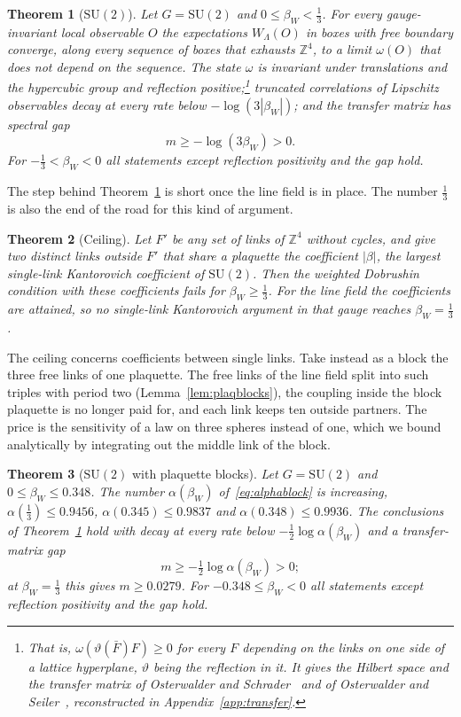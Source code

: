 \documentclass[aps,prd,twocolumn,superscriptaddress,nofootinbib,longbibliography,floatfix,amsmath,amssymb,10pt]{revtex4-2}
\newtheorem{theorem}{Theorem}
\theoremstyle{definition}
\theoremstyle{remark}
\newcommand{\Z}{\mathbb{Z}}
\newcommand{\SU}{\mathrm{SU}}
\begin{document}
\begin{theorem}[$\SU(2)$]\label{thm:su2}
Let $G=\SU(2)$ and $0\le\beta_W<\frac13$. For every gauge-invariant local
observable $O$ the expectations $W_\Lambda(O)$ in boxes with free boundary
converge, along every sequence of boxes that exhausts $\Z^4$, to a limit
$\omega(O)$ that does not depend on the sequence. The state $\omega$ is
invariant under translations and the hypercubic group and reflection
positive;\footnote{That is, $\omega(\vartheta(\bar F)F)\ge0$ for every $F$ depending on the links on one side of a lattice hyperplane, $\vartheta$ being the reflection in it. It gives the Hilbert space and the transfer matrix of Osterwalder and Schrader~\cite{OS73,OS75} and of Osterwalder and Seiler~\cite{OSei78}, reconstructed in Appendix~\ref{app:transfer}.} truncated correlations of Lipschitz observables decay at every
rate below $-\log(3|\beta_W|)$; and the transfer matrix has spectral gap
\[
m\ge-\log(3\beta_W)>0 .
\]
For $-\frac13<\beta_W<0$ all statements except reflection positivity and the
gap hold.
\end{theorem}

The step behind Theorem~\ref{thm:su2} is short once the line field is in
place. The number $\frac13$ is also
the end of the road for this kind of argument.

\begin{theorem}[Ceiling]\label{thm:ceiling}
Let $F'$ be any set of links of $\Z^4$ without cycles, and give two distinct
links outside $F'$ that share a plaquette the coefficient $|\beta|$, the
largest single-link Kantorovich coefficient of $\SU(2)$. Then the weighted
Dobrushin condition with these coefficients fails for $\beta_W\ge\frac13$.
For the line field the coefficients are attained, so no single-link
Kantorovich argument in that gauge reaches $\beta_W=\frac13$.
\end{theorem}

The ceiling concerns coefficients between single links. Take instead as a
block the three free links of one plaquette. The free links of the line
field split into such triples with period two (Lemma~\ref{lem:plaqblocks}),
the coupling inside the block plaquette is no longer paid for, and each link
keeps ten outside partners. The price is the sensitivity of a law on three
spheres instead of one, which we bound analytically by integrating out the
middle link of the block.

\begin{theorem}[$\SU(2)$ with plaquette blocks]\label{thm:blocks}
Let $G=\SU(2)$ and $0\le\beta_W\le0.348$. The number $\alpha(\beta_W)$
of~\eqref{eq:alphablock} is increasing, $\alpha(\frac13)\le0.9456$,
$\alpha(0.345)\le0.9837$ and $\alpha(0.348)\le0.9936$. The conclusions of Theorem~\ref{thm:su2} hold
with decay at every rate below $-\frac12\log\alpha(\beta_W)$ and a
transfer-matrix gap
\[
m\ge-\tfrac12\log\alpha(\beta_W)>0 ;
\]
at $\beta_W=\frac13$ this gives $m\ge0.0279$. For $-0.348\le\beta_W<0$ all
statements except reflection positivity and the gap hold.
\end{theorem}
\end{document}
